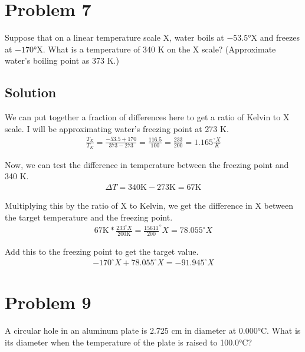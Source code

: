 \documentclass[12pt]{article}
\begin{document}
    \pagebreak
    \section{Problem 7}
        Suppose that on a linear temperature scale X, water boils at $-53.5$°X and freezes at $-170$°X. What is a temperature of 340 K on the X scale? (Approximate water's boiling point as 373 K.)

        \subsection{Solution}
            We can put together a fraction of differences here to get a ratio of Kelvin to X scale.
            I will be approximating water's freezing point at 273 K.
            \begin{gather}
                \frac{T_X}{T_K} =   \frac{-53.5 + 170}{373 - 273} = \frac{116.5}{100} = \frac{233}{200} = 1.165 \frac{^\circ X}{K}
            \end{gather}

            Now, we can test the difference in temperature between the freezing point and 340 K.
            \begin{gather}
                \Delta T    =   340 \unit{\kelvin} - 273 \unit{\kelvin} = 67 \unit{\kelvin}
            \end{gather}

            Multiplying this by the ratio of \textdegree X to Kelvin, we get the difference in X between the target temperature and the freezing point.
            \begin{gather}
                67 \unit{\kelvin} * \frac{233^\circ X}{200 \unit{\kelvin}} = \frac{15611}{200} ^\circ X = 78.055 ^\circ X
            \end{gather}

            Add this to the freezing point to get the target value.
            \begin{gather}
                -170 ^\circ X + 78.055 ^\circ X = \boxed{-91.945 ^\circ X}
            \end{gather}

    \pagebreak
    \section{Problem 9}
        A circular hole in an aluminum plate is 2.725 \unit{\centi\meter} in diameter at 0.000\unit{\celsius}. What is its diameter when the temperature of the plate is raised to 100.0\unit{\celsius}?
\end{document}

